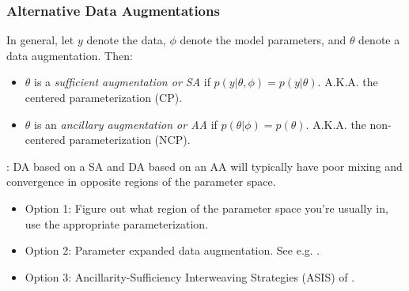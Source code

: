 \documentclass[xcolor=dvipsnames]{beamer}
\begin{document}
\begin{frame}
  \frametitle{Alternative Data Augmentations}
In general, let $y$ denote the data, $\phi$ denote the model parameters, and $\theta$ denote a data augmentation. Then:

\begin{itemize}
  \item $\theta$ is a {\it \color{red} sufficient augmentation or SA} if $p(y|\theta, \phi) = p(y|\theta)$. A.K.A. the centered parameterization (CP).
  \item $\theta$ is an {\it \color{red} ancillary augmentation or AA} if $p(\theta|\phi) = p(\theta)$. A.K.A. the non-centered parameterization (NCP).
\end{itemize}
\pause

\citet{papaspiliopoulos2007general}: DA based on a SA and DA based on an AA will typically have poor mixing and convergence in opposite regions of the parameter space.\pause
\begin{itemize}
\item Option 1: Figure out what region of the parameter space you're usually in, use the appropriate parameterization.

\item Option 2: Parameter expanded data augmentation. See e.g. \citet{van2001art}.

\item Option 3: Ancillarity-Sufficiency Interweaving Strategies (ASIS) of \citet{yu2011center}.
\end{itemize}
\end{frame}
\end{document}

